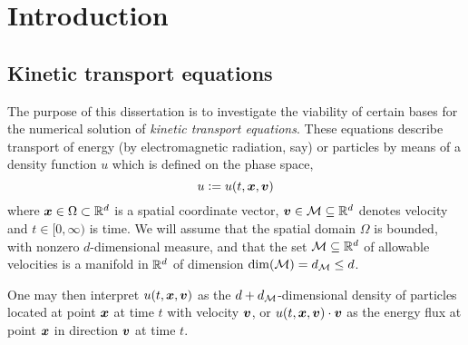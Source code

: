 \chapter{Introduction}
\label{chap:intro}

\section{Kinetic transport equations}

The purpose of this dissertation is to investigate the viability of certain bases for the numerical solution
of {\em kinetic transport equations}. These equations describe transport of energy (by electromagnetic
radiation, say) or particles by means of a density function $u$ which is defined on the phase space,
\[
    u \vcentcolon= u(t,{\bm x},{\bm v})
\]
where ${\bm x}\in\Omega\subset\mathbb{R}^d$ is a spatial coordinate vector, ${\bm v}\in\mathcal{M}\subseteq\mathbb{R}^d$ denotes velocity
and $t\in[0,\infty)$ is time. We will assume that the spatial domain $\Omega$ is bounded, with nonzero
$d$-dimensional measure, and that the set $\mathcal{M}\subseteq\mathbb{R}^d$ of allowable velocities is a manifold in
$\mathbb{R}^d$ of dimension $\dim(\mathcal{M}) = d_{\mathcal{M}} \leq d$.

One may then interpret $u(t,{\bm x},{\bm v})$ as the $d+d_{\mathcal{M}}$-dimensional density of particles located at point ${\bm x}$
at time $t$ with velocity ${\bm v}$, or $u(t,{\bm x},{\bm v})\cdot{\bm v}$ as the energy flux at point ${\bm x}$ in direction
${\bm v}$ at time $t$.

